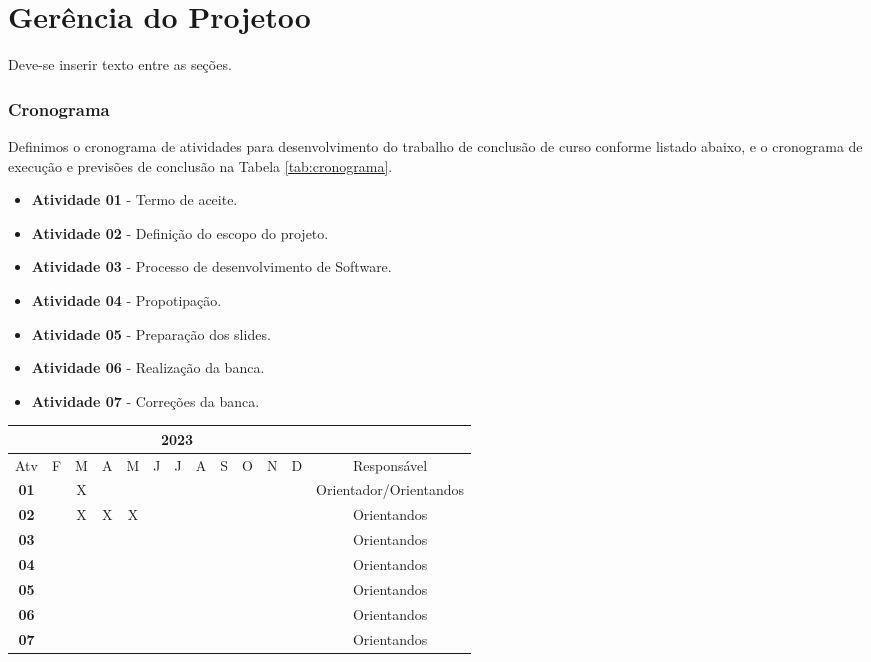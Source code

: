 \chapter{Gerência do Projetoo}\label{cap:desenvolvimento}
Deve-se inserir texto entre as seções.
\subsection{Cronograma}

Definimos o cronograma de atividades para desenvolvimento do trabalho de conclusão de curso conforme listado abaixo, e o cronograma de execução e previsões de conclusão na Tabela \ref{tab:cronograma}.

\begin{itemize}
    \item \textbf{Atividade 01} - Termo de aceite.
    \item \textbf{Atividade 02} - Definição do escopo do projeto.
    \item \textbf{Atividade 03} - Processo de desenvolvimento de Software.
    \item \textbf{Atividade 04} - Propotipação.
    \item \textbf{Atividade 05} - Preparação dos slides.
    \item \textbf{Atividade 06} - Realização da banca.
    \item \textbf{Atividade 07} - Correções da banca.
\end{itemize}

\begin{table*}[ht]
\centering
\caption{Cronograma das atividades}
\label{tab:cronograma}
\begin{tabular}{|c|c|c|c|c|c|c|c|c|c|c|c|c|}
\hline & \multicolumn{11}{|c|}{2023} & \multicolumn{1}{|c|}{} \\
\hline \multicolumn{1}{|c|}{Atv} & F & M & A & M & J & J & A & S & O & N & D & {Responsável} \\
\hline \textbf{01} & & X& & & & & & & & & & Orientador/Orientandos \\
\hline \textbf{02} & & X& X& X& & & & & & & & Orientandos \\
\hline \textbf{03} & & & & & & & & & & & & Orientandos\\
\hline \textbf{04} & & & & & & & & & & & & Orientandos\\
\hline \textbf{05} & & & & & & & & & & & & Orientandos\\
\hline \textbf{06} & & & & & & & & & & & & Orientandos\\
\hline \textbf{07} & & & & & & & & & & & & Orientandos\\
\hline
\end{tabular} 
\end{table*}

